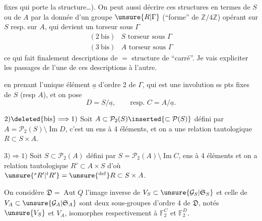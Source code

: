 fixes qui porte la structure\ldots).
On peut aussi décrire ces structures en termes de $S$ ou de $A$ par la donnée
d'un groupe $\unsure{R|\Gamma}$ (``forme'' de $\mathbb{Z}/4\mathbb{Z}$) opérant
sur $S$ resp. sur $A$, qui devient un torseur sous $\Gamma$
\[
\begin{array}{ll}
(2\ \mathrm{bis}) & S\text{ torseur sous }\Gamma\\
(3\ \mathrm{bis}) & A\text{ torseur sous }\Gamma
\end{array}
\]
ce qui fait finalement  descriptions de
 $=$ structure de ``carré''.
Je vais expliciter les passages de l'une de ces descriptions à l'autre.

en prenant l'unique élément $\underline{a}$ d'ordre 2 de $\Gamma$,
qui est une involution ss pts fixes de $S$ (resp $A$), et on pose
\[
D=S/\underline{a},\qquad\text{resp. }C=A/\underline{a}.
\]

$2)\deleted{\mathrm{bis}}\Longrightarrow1)$
Soit $A\subset\mathcal{P}_2(S)\inserted{\subset\mathcal{P}(S)}$ défini par
$A=\mathcal{P}_2(S)\setminus\operatorname{Im}D$,
c'est un ens à 4 éléments,  et on a une relation tautologique
$R\subset S\times A$.

$3)\Longrightarrow1)$
Soit $S\subset\mathcal{P}_2(A)$ défini par
$S=\mathcal{P}_2(A)\setminus\operatorname{Im}C$,
ens à 4 éléments et on a relation tautologique $R'\subset A\times S$ d'où
$\unsure{{}^{s}R'|{}^{t}R'}=\unsure{{}^{\mathrm{def}}}R\subset S\times A$.

On considère $\mathfrak{D}=\operatorname{Aut}\underline{Q}$
l'image inverse de $V_S\subset\unsure{\mathcal{G}_S|\mathfrak{S}_S}$ et celle de
$V_A\subset\unsure{\mathcal{G}_A|\mathfrak{S}_A}$ sont deux sous-groupes d'ordre 4
 de $\mathfrak{D}$, notés
$\unsure{V_S}$ et $V_A$, isomorphes respectivement à
$\mathbb{F}_2^C$ et $\mathbb{F}_2^D$.

